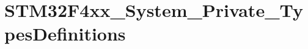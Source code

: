 \hypertarget{group___s_t_m32_f4xx___system___private___types_definitions}{}\section{S\+T\+M32\+F4xx\+\_\+\+System\+\_\+\+Private\+\_\+\+Types\+Definitions}
\label{group___s_t_m32_f4xx___system___private___types_definitions}
